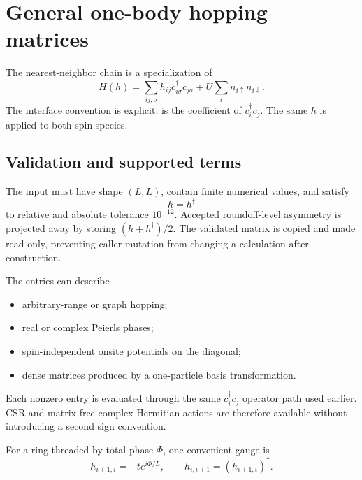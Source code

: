 \chapter{General one-body hopping matrices}
\label{chap:generalhopping}

The nearest-neighbor chain is a specialization of
\begin{equation}
H(h)=\sum_{ij,\sigma}h_{ij}c_{i\sigma}^\dagger c_{j\sigma}
 +U\sum_i n_{i\uparrow}n_{i\downarrow}.
\label{eq:generalh}
\end{equation}
The interface convention is explicit:  is the coefficient of
$c_i^\dagger c_j$.  The same $h$ is applied to both spin species.

\section{Validation and supported terms}

The input must have shape $(L,L)$, contain finite numerical values, and satisfy
\begin{equation}
h=h^\dagger
\end{equation}
to relative and absolute tolerance $10^{-12}$.  Accepted roundoff-level
asymmetry is projected away by storing $(h+h^\dagger)/2$.  The validated matrix
is copied and made read-only, preventing caller mutation from changing a
calculation after construction.

The entries can describe
\begin{itemize}
\item arbitrary-range or graph hopping;
\item real or complex Peierls phases;
\item spin-independent onsite potentials on the diagonal;
\item dense matrices produced by a one-particle basis transformation.
\end{itemize}
Each nonzero entry is evaluated through the same $c_i^\dagger c_j$ operator
path used earlier.  CSR and matrix-free complex-Hermitian actions are therefore
available without introducing a second sign convention.

For a ring threaded by total phase $\Phi$, one convenient gauge is
\begin{equation}
h_{i+1,i}=-t e^{i\Phi/L},\qquad
h_{i,i+1}=\left(h_{i+1,i}\right)^*.
\end{equation}



